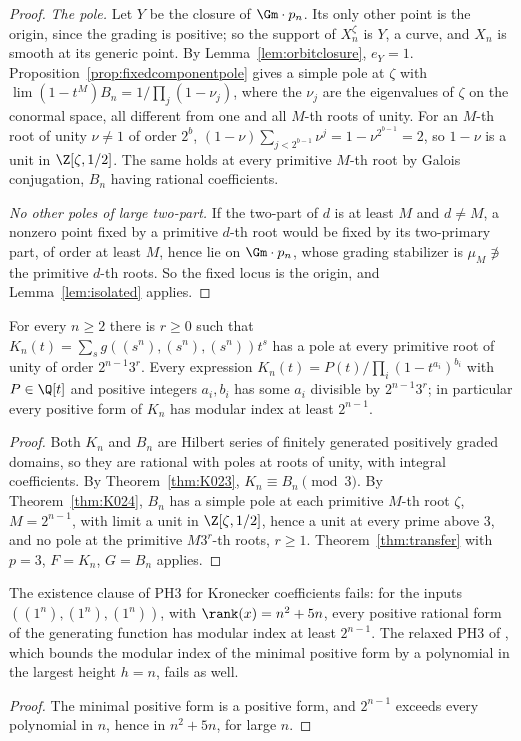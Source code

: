 \begin{proof}
\emph{The pole.} Let $Y$ be the closure of $\Gm\cdot p_n$. Its only other point
is the origin, since the grading is positive; so the support of
$X_n^{\zeta}$ is $Y$, a curve, and $X_n$ is smooth at its generic point. By
Lemma~\ref{lem:orbitclosure}, $e_Y=1$. Proposition~\ref{prop:fixedcomponentpole}
gives a simple pole at $\zeta$ with $\lim(1-t^M)B_n=1/\prod_j(1-\nu_j)$, where
the $\nu_j$ are the eigenvalues of $\zeta$ on the conormal space, all
different from one and all $M$-th roots of unity. For an $M$-th root of unity
$\nu\ne1$ of order $2^b$, $(1-\nu)\sum_{j<2^{b-1}}\nu^j=1-\nu^{2^{b-1}}=2$, so
$1-\nu$ is a unit in $\Z[\zeta,1/2]$. The same holds at every primitive
$M$-th root by Galois conjugation, $B_n$ having rational coefficients.

\emph{No other poles of large two-part.} If the two-part of $d$ is at least $M$
and $d\ne M$, a nonzero point fixed by a primitive $d$-th root would be fixed by
its two-primary part, of order at least $M$, hence lie on $\Gm\cdot p_n$, whose
grading stabilizer is $\mu_M\not\ni$ the primitive $d$-th roots. So the fixed
locus is the origin, and Lemma~\ref{lem:isolated} applies.
\end{proof}

\begin{theorem}\label{thm:kronecker}
For every $n\ge2$ there is $r\ge0$ such that $K_n(t)=\sum_sg((s^n),(s^n),
(s^n))t^s$ has a pole at every primitive root of unity of order $2^{n-1}3^r$.
Every expression $K_n(t)=P(t)/\prod_i(1-t^{a_i})^{b_i}$ with $P\in\Q[t]$ and
positive integers $a_i,b_i$ has some $a_i$ divisible by $2^{n-1}3^r$; in
particular every positive form of $K_n$ has modular index at least $2^{n-1}$.
\end{theorem}

\begin{proof}
Both $K_n$ and $B_n$ are Hilbert series of finitely generated positively graded
domains, so they are rational with poles at roots of unity, with integral
coefficients. By Theorem~\ref{thm:K023}, $K_n\equiv B_n\pmod 3$. By
Theorem~\ref{thm:K024}, $B_n$ has a simple pole at each primitive $M$-th root
$\zeta$, $M=2^{n-1}$, with limit a unit in $\Z[\zeta,1/2]$, hence a unit at
every prime above $3$, and no pole at the primitive $M3^r$-th roots, $r\ge1$.
Theorem~\ref{thm:transfer} with $p=3$, $F=K_n$, $G=B_n$ applies.
\end{proof}

\begin{corollary}\label{cor:kroneckerPH3}
The existence clause of PH3 for Kronecker coefficients \cite[Hypothesis
3.3.4]{GCT6} fails: for the inputs $((1^n),(1^n),(1^n))$, with
$\rank(x)=n^2+5n$, every positive rational form of the generating function has
modular index at least $2^{n-1}$. The relaxed PH3 of \cite[Appendix,
p.~20]{BOR}, which bounds the modular index of the minimal positive form by a
polynomial in the largest height $h=n$, fails as well.
\end{corollary}

\begin{proof}
The minimal positive form is a positive form, and $2^{n-1}$ exceeds every
polynomial in $n$, hence in $n^2+5n$, for large $n$.
\end{proof}

